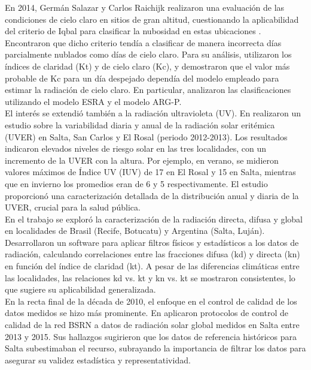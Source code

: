 En 2014, Germán Salazar y Carlos Raichijk realizaron una evaluación de las condiciones de cielo claro en sitios de gran altitud, cuestionando la aplicabilidad del criterio de Iqbal para clasificar la nubosidad en estas ubicaciones \cite{Salazar2014}. Encontraron que dicho criterio tendía a clasificar de manera incorrecta días parcialmente nublados como días de cielo claro. Para su análisis, utilizaron los índices de claridad (Kt) y de cielo claro (Kc), y demostraron que el valor más probable de Kc para un día despejado dependía del modelo empleado para estimar la radiación de cielo claro. En particular, analizaron las clasificaciones utilizando el modelo ESRA \citep{Rigollier2000} y el modelo ARG-P.\\

El interés se extendió también a la radiación ultravioleta (UV). En \cite{Suazarez2014} realizaron un estudio sobre la variabilidad diaria y anual de la radiación solar eritémica (UVER) en Salta, San Carlos y El Rosal (periodo 2012-2013). Los resultados indicaron elevados niveles de riesgo solar en las tres localidades, con un incremento de la UVER con la altura. Por ejemplo, en verano, se midieron valores máximos de Índice UV (IUV) de 17 en El Rosal y 15 en Salta, mientras que en invierno los promedios eran de 6 y 5 respectivamente. El estudio proporcionó una caracterización detallada de la distribución anual y diaria de la UVER, crucial para la salud pública.\\

En el trabajo \cite{Vilela2015} se exploró la caracterización de la radiación directa, difusa y global en localidades de Brasil (Recife, Botucatu) y Argentina (Salta, Luján). Desarrollaron un software para aplicar filtros físicos y estadísticos a los datos de radiación, calculando correlaciones entre las fracciones difusa (kd) y directa (kn) en función del índice de claridad (kt). A pesar de las diferencias climáticas entre las localidades, las relaciones kd vs. kt y kn vs. kt se mostraron consistentes, lo que sugiere su aplicabilidad generalizada.\\

En la recta final de la década de 2010, el enfoque en el control de calidad de los datos medidos se hizo más prominente. En \cite{RomanoArmada2017} aplicaron protocolos de control de calidad de la red BSRN a datos de radiación solar global medidos en Salta entre 2013 y 2015. Sus hallazgos sugirieron que los datos de referencia históricos para Salta subestimaban el recurso, subrayando la importancia de filtrar los datos para asegurar su validez estadística y representatividad.\\

